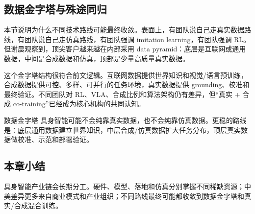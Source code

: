 \subsection{数据金字塔与殊途同归}

本节说明为什么不同技术路线可能最终收敛。表面上，有团队说自己走真实数据路线，有团队说自己走仿真路线，有团队强调 imitation learning，有团队强调 RL。但谢晨观察到，顶尖客户越来越在内部采用 data pyramid：底层是互联网或通用数据，中间是合成数据和仿真，顶部是少量高质量真实数据。

这个金字塔结构很符合前文逻辑。互联网数据提供世界知识和视觉/语言预训练，合成数据提供可控、多样、可并行的任务环境，真实数据提供 grounding、校准和最终验证。不同团队对 RL、VLA、合成比例和算法架构仍有差异，但“真实 + 合成 co-training”已经成为核心机构的共同认知。

\begin{importantbox}{数据金字塔}
具身智能可能不会纯靠真实数据，也不会纯靠仿真数据。更稳的路线是：底层通用数据建立世界知识，中层合成/仿真数据扩大任务分布，顶层真实数据做校准、示范和部署验证。
\end{importantbox}

\subsection{本章小结}

具身智能产业链会长期分工。硬件、模型、落地和仿真分别掌握不同稀缺资源；中美差异更多来自商业模式和产业组织；不同路线最终可能都收敛到数据金字塔和真实/合成混合训练。

